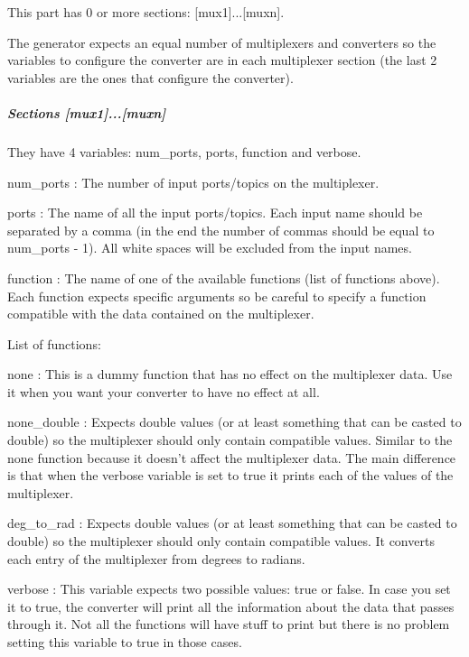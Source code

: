 This part has 0 or more sections\-: {\ttfamily \mbox{[}mux1\mbox{]}...\mbox{[}muxn\mbox{]}}.

The generator expects an equal number of multiplexers and converters so the variables to configure the converter are in each multiplexer section (the last 2 variables are the ones that configure the converter).

\subparagraph*{Sections \mbox{[}mux1\mbox{]}...\mbox{[}muxn\mbox{]}}

They have 4 variables\-: {\ttfamily num\-\_\-ports}, {\ttfamily ports}, {\ttfamily function} and {\ttfamily verbose}.

{\ttfamily num\-\_\-ports} \-: The number of input ports/topics on the multiplexer.

{\ttfamily ports} \-: The name of all the input ports/topics. Each input name should be separated by a comma (in the end the number of commas should be equal to {\ttfamily num\-\_\-ports -\/ 1}). All white spaces will be excluded from the input names.

{\ttfamily function} \-: The name of one of the available functions (list of functions above). Each function expects specific arguments so be careful to specify a function compatible with the data contained on the multiplexer.

List of functions\-:


\begin{DoxyItemize}
\item {\ttfamily none} \-: This is a dummy function that has no effect on the multiplexer data. Use it when you want your converter to have no effect at all.
\item {\ttfamily none\-\_\-double} \-: Expects {\ttfamily double} values (or at least something that can be casted to {\ttfamily double}) so the multiplexer should only contain compatible values. Similar to the {\ttfamily none} function because it doesn't affect the multiplexer data. The main difference is that when the {\ttfamily verbose} variable is set to {\ttfamily true} it prints each of the values of the multiplexer.
\item {\ttfamily deg\-\_\-to\-\_\-rad} \-: Expects {\ttfamily double} values (or at least something that can be casted to {\ttfamily double}) so the multiplexer should only contain compatible values. It converts each entry of the multiplexer from degrees to radians.
\end{DoxyItemize}

{\ttfamily verbose} \-: This variable expects two possible values\-: {\ttfamily true} or {\ttfamily false}. In case you set it to {\ttfamily true}, the converter will print all the information about the data that passes through it. Not all the functions will have stuff to print but there is no problem setting this variable to {\ttfamily true} in those cases.

